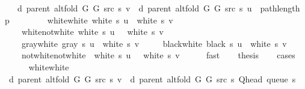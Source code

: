 \begin{isabellebody}
\ \ \ {\isachardoublequoteopen}d\ {\isacharparenleft}{\kern0pt}parent\ {\isacharparenleft}{\kern0pt}alt{\isacharunderscore}{\kern0pt}fold\ G{}\ G{}\ src\ s{\isacharparenright}{\kern0pt}{\isacharparenright}{\kern0pt}\ v\ {\isasymle}\ d\ {\isacharparenleft}{\kern0pt}parent\ {\isacharparenleft}{\kern0pt}alt{\isacharunderscore}{\kern0pt}fold\ G{}\ G{}\ src\ s{\isacharparenright}{\kern0pt}{\isacharparenright}{\kern0pt}\ u\ {\isacharplus}{\kern0pt}\ path{\isacharunderscore}{\kern0pt}length\ p{\isachardoublequoteclose}\isanewline
%
\isadelimproof
%
\endisadelimproof
%
\isatagproof
{}\isamarkupfalse%
\ {\isacharminus}{\kern0pt}\isanewline
\ \ \isamarkupfalse%
\isanewline
\ \ \ \ {\isacharparenleft}{\kern0pt}white{\isacharunderscore}{\kern0pt}white{\isacharparenright}{\kern0pt}\ {\isachardoublequoteopen}white\ s\ u\ {\isasymand}\ white\ s\ v{\isachardoublequoteclose}\ {\isacharbar}{\kern0pt}\isanewline
\ \ \ \ {\isacharparenleft}{\kern0pt}white{\isacharunderscore}{\kern0pt}not{\isacharunderscore}{\kern0pt}white{\isacharparenright}{\kern0pt}\ {\isachardoublequoteopen}white\ s\ u\ {\isasymand}\ {\isasymnot}\ white\ s\ v{\isachardoublequoteclose}\ {\isacharbar}{\kern0pt}\isanewline
\ \ \ \ {\isacharparenleft}{\kern0pt}gray{\isacharunderscore}{\kern0pt}white{\isacharparenright}{\kern0pt}\ {\isachardoublequoteopen}gray\ s\ u\ {\isasymand}\ white\ s\ v{\isachardoublequoteclose}\ {\isacharbar}{\kern0pt}\isanewline
\ \ \ \ {\isacharparenleft}{\kern0pt}black{\isacharunderscore}{\kern0pt}white{\isacharparenright}{\kern0pt}\ {\isachardoublequoteopen}black\ s\ u\ {\isasymand}\ white\ s\ v{\isachardoublequoteclose}\ {\isacharbar}{\kern0pt}\isanewline
\ \ \ \ {\isacharparenleft}{\kern0pt}not{\isacharunderscore}{\kern0pt}white{\isacharunderscore}{\kern0pt}not{\isacharunderscore}{\kern0pt}white{\isacharparenright}{\kern0pt}\ {\isachardoublequoteopen}{\isasymnot}\ white\ s\ u\ {\isasymand}\ {\isasymnot}\ white\ s\ v{\isachardoublequoteclose}\isanewline
\ \ \ \ \isamarkupfalse%
\ fast\isanewline
\ \ \isamarkupfalse%
\ {\isacharquery}{\kern0pt}thesis\isanewline
\ \ \isamarkupfalse%
\ {\isacharparenleft}{\kern0pt}cases{\isacharparenright}{\kern0pt}\isanewline
\ \ \ \ \isamarkupfalse%
\ white{\isacharunderscore}{\kern0pt}white\isanewline
\ \ \ \ \isamarkupfalse%
\ {\isachardoublequoteopen}d\ {\isacharparenleft}{\kern0pt}parent\ {\isacharparenleft}{\kern0pt}alt{\isacharunderscore}{\kern0pt}fold\ G{}\ G{}\ src\ s{\isacharparenright}{\kern0pt}{\isacharparenright}{\kern0pt}\ v\ {\isacharequal}{\kern0pt}\ d\ {\isacharparenleft}{\kern0pt}parent\ {\isacharparenleft}{\kern0pt}alt{\isacharunderscore}{\kern0pt}fold\ G{}\ G{}\ src\ s{\isacharparenright}{\kern0pt}{\isacharparenright}{\kern0pt}\ {\isacharparenleft}{\kern0pt}Q{\isacharunderscore}{\kern0pt}head\ {\isacharparenleft}{\kern0pt}queue\ s{\isacharparenright}{\kern0pt}{\isacharparenright}{\kern0pt}\ {\isacharplus}{\kern0pt}\ {}{\isachardoublequoteclose}\isanewline

\end{isabellebody}
